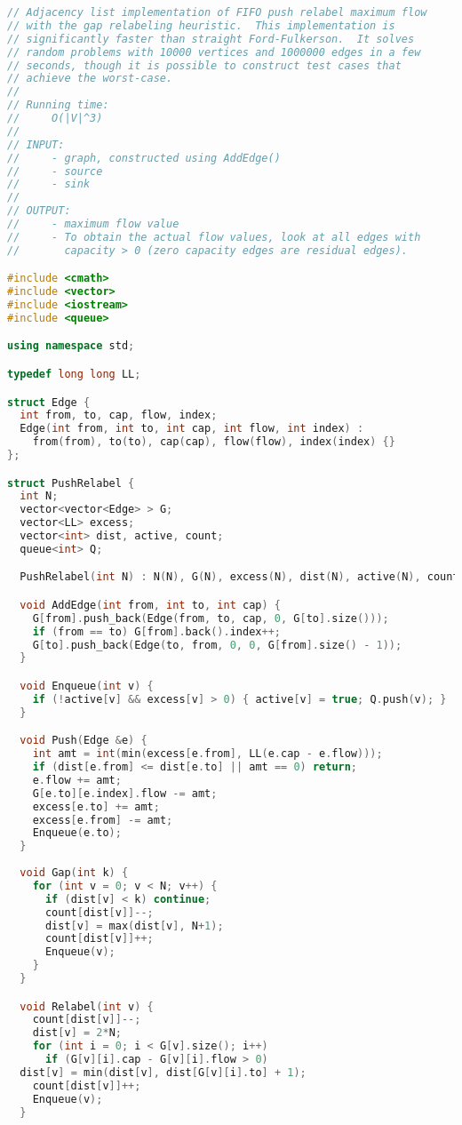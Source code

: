 \begin{lstlisting}[language=C++]
// Adjacency list implementation of FIFO push relabel maximum flow
// with the gap relabeling heuristic.  This implementation is
// significantly faster than straight Ford-Fulkerson.  It solves
// random problems with 10000 vertices and 1000000 edges in a few
// seconds, though it is possible to construct test cases that
// achieve the worst-case.
//
// Running time:
//     O(|V|^3)
//
// INPUT: 
//     - graph, constructed using AddEdge()
//     - source
//     - sink
//
// OUTPUT:
//     - maximum flow value
//     - To obtain the actual flow values, look at all edges with
//       capacity > 0 (zero capacity edges are residual edges).

#include <cmath>
#include <vector>
#include <iostream>
#include <queue>

using namespace std;

typedef long long LL;

struct Edge {
  int from, to, cap, flow, index;
  Edge(int from, int to, int cap, int flow, int index) :
    from(from), to(to), cap(cap), flow(flow), index(index) {}
};

struct PushRelabel {
  int N;
  vector<vector<Edge> > G;
  vector<LL> excess;
  vector<int> dist, active, count;
  queue<int> Q;

  PushRelabel(int N) : N(N), G(N), excess(N), dist(N), active(N), count(2*N) {}

  void AddEdge(int from, int to, int cap) {
    G[from].push_back(Edge(from, to, cap, 0, G[to].size()));
    if (from == to) G[from].back().index++;
    G[to].push_back(Edge(to, from, 0, 0, G[from].size() - 1));
  }

  void Enqueue(int v) { 
    if (!active[v] && excess[v] > 0) { active[v] = true; Q.push(v); } 
  }

  void Push(Edge &e) {
    int amt = int(min(excess[e.from], LL(e.cap - e.flow)));
    if (dist[e.from] <= dist[e.to] || amt == 0) return;
    e.flow += amt;
    G[e.to][e.index].flow -= amt;
    excess[e.to] += amt;    
    excess[e.from] -= amt;
    Enqueue(e.to);
  }
  
  void Gap(int k) {
    for (int v = 0; v < N; v++) {
      if (dist[v] < k) continue;
      count[dist[v]]--;
      dist[v] = max(dist[v], N+1);
      count[dist[v]]++;
      Enqueue(v);
    }
  }

  void Relabel(int v) {
    count[dist[v]]--;
    dist[v] = 2*N;
    for (int i = 0; i < G[v].size(); i++) 
      if (G[v][i].cap - G[v][i].flow > 0)
  dist[v] = min(dist[v], dist[G[v][i].to] + 1);
    count[dist[v]]++;
    Enqueue(v);
  }


\end{lstlisting}
